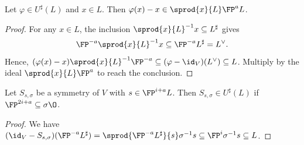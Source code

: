 %

\begin{lemma}\label{ker:congruence}
 Let $\varphi \in U^\sharp(L)$ and $x \in L$.
  Then $\varphi(x) - x \in \sprod{x}{L} \FP^a L$.
\end{lemma}
\begin{proof}
For any $x \in L$, the inclusion
$\sprod{x}{L}^{-1}x \subseteq L^\sharp$ gives
\[\FP^{-a}\sprod{x}{L}^{-1} x \subseteq \FP^{-a}L^\sharp = L^\vee .\]
  Hence, $(\varphi(x) -x)\sprod{x}{L}^{-1}\FP^{-a} \subseteq (\varphi - \id_V)(L^\vee) \subseteq L$.
  Multiply by the ideal $\sprod{x}{L}\FP^{a}$ to reach the conclusion.
\end{proof}

\begin{lemma}\label{lem:refl-ker}
  Let $S_{s, \sigma}$ be a symmetry of $V$ with $s \in \FP^{i+a} L$. Then $S_{s, \sigma}
  \in U^\sharp(L)$ if $\FP^{2i+a} \subseteq \sigma \O$.
\end{lemma}
\begin{proof}
  We have  $(\id_V-S_{s,\sigma})(\FP^{-a}L^\sharp) = \sprod{\FP^{-a}L^\sharp}{s}\sigma^{-1}s \subseteq \FP^{i} \sigma^{-1} s \subseteq L$.
\end{proof}

